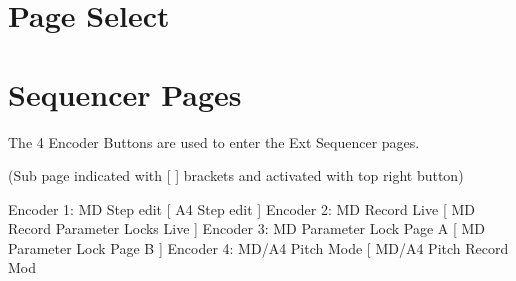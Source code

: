 \section{Page Select}

\section{Sequencer Pages}
The 4 Encoder Buttons are used to enter the Ext Sequencer pages.

(Sub page indicated with [ ] brackets and activated with top right button)

Encoder 1: MD Step edit                         [ A4 Step edit ]
Encoder 2: MD Record Live                     [ MD Record Parameter Locks Live ]
Encoder 3: MD Parameter Lock Page A  [ MD Parameter Lock Page B ]
Encoder 4: MD/A4 Pitch Mode               [ MD/A4 Pitch Record Mod
